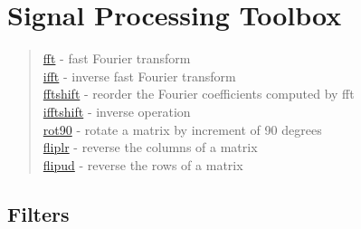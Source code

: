 \chapter*{Signal Processing Toolbox}

\begin{quote}
\noindent
\hyperlink{fft}{fft} - {fast Fourier transform} \\
\hyperlink{ifft}{ifft} - {inverse fast Fourier transform} \\
\hyperlink{fftshift}{fftshift} - {reorder the Fourier coefficients computed by fft} \\
\hyperlink{ifftshift}{ifftshift} - {inverse operation} \\
\hyperlink{rot90}{rot90} - {rotate a matrix by increment of 90 degrees} \\
\hyperlink{fliplr}{fliplr} - {reverse the columns of a matrix} \\
\hyperlink{flipud}{flipud} - {reverse the rows of a matrix} \\
\end{quote}





\section*{Filters}

